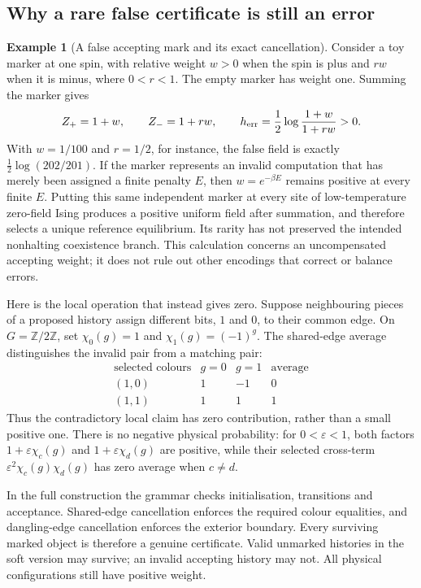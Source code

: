 \documentclass[11pt,reqno]{amsart}
\numberwithin{equation}{section}
\theoremstyle{definition}
\newtheorem{example}[theorem]{Example}
\theoremstyle{remark}
\newcommand{\Z}{\mathbb Z}
\begin{document}
\par\noindent
\begin{minipage}{\textwidth}
\subsection{Why a rare false certificate is still an error}
\begin{example}[A false accepting mark and its exact cancellation]\label{ex:false-certificate}
Consider a toy marker at one spin, with relative weight $w>0$ when the spin is plus and $rw$ when it is minus, where $0<r<1$. The empty marker has weight one. Summing the marker gives
\[
 Z_+=1+w,\qquad Z_-=1+rw,\qquad
 h_{\rm err}=\frac12\log\frac{1+w}{1+rw}>0.
\]
With $w=1/100$ and $r=1/2$, for instance, the false field is exactly $\frac12\log(202/201)$. If the marker represents an invalid computation that has merely been assigned a finite penalty $E$, then $w=e^{-\beta E}$ remains positive at every finite $E$. Putting this same independent marker at every site of low-temperature zero-field Ising produces a positive uniform field after summation, and therefore selects a unique reference equilibrium. Its rarity has not preserved the intended nonhalting coexistence branch. This calculation concerns an uncompensated accepting weight; it does not rule out other encodings that correct or balance errors.

Here is the local operation that instead gives zero. Suppose neighbouring pieces of a proposed history assign different bits, $1$ and $0$, to their common edge. On $G=\Z/2\Z$, set $\chi_0(g)=1$ and $\chi_1(g)=(-1)^g$. The shared-edge average distinguishes the invalid pair from a matching pair:
\[
 \begin{array}{c|cc|c}
  \text{selected colours}&g=0&g=1&\text{average}\\ \hline
  (1,0)&1&-1&0\\
  (1,1)&1& 1&1
 \end{array}
\]
Thus the contradictory local claim has zero contribution, rather than a small positive one. There is no negative physical probability: for $0<\varepsilon<1$, both factors $1+\varepsilon\chi_c(g)$ and $1+\varepsilon\chi_d(g)$ are positive, while their selected cross-term $\varepsilon^2\chi_c(g)\chi_d(g)$ has zero average when $c\ne d$.

In the full construction the grammar checks initialisation, transitions and acceptance. Shared-edge cancellation enforces the required colour equalities, and dangling-edge cancellation enforces the exterior boundary. Every surviving marked object is therefore a genuine certificate. Valid unmarked histories in the soft version may survive; an invalid accepting history may not. All physical configurations still have positive weight.
\end{example}
\end{minipage}
\par\medskip
\end{document}
